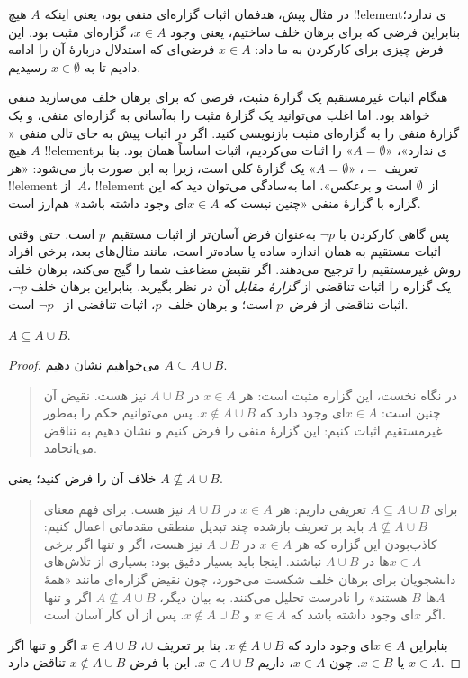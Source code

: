 \documentclass[../../../include/open-logic-section]{subfiles}
\begin{document}
در مثال پیش، هدفمان اثبات گزاره‌ای منفی بود، یعنی اینکه $A$ هیچ
!!{element}ی ندارد؛ بنابراین فرضی که برای برهان خلف ساختیم، یعنی وجود
$x \in A$، گزاره‌ای مثبت بود. این فرض چیزی برای کارکردن به ما داد:
$x \in A$ فرضی‌ای که استدلال دربارهٔ آن را ادامه دادیم تا به
$x \in \emptyset$ رسیدیم.

هنگام اثبات غیرمستقیم یک گزارهٔ مثبت، فرضی که برای برهان خلف می‌سازید
منفی خواهد بود. اما اغلب می‌توانید یک گزارهٔ مثبت را به‌آسانی به
گزاره‌ای منفی، و یک گزارهٔ منفی را به گزاره‌ای مثبت بازنویسی کنید.
اگر در اثبات پیش به جای تالی منفی «$A$ هیچ !!{element}ی ندارد»،
«$A = \emptyset$» را اثبات می‌کردیم، اثبات اساساً همان بود. بنا بر
تعریف $=$، «$A = \emptyset$» یک گزارهٔ کلی است، زیرا به این صورت باز
می‌شود: «هر !!{element} از~$A$، !!{element} از~$\emptyset$ است و
برعکس». اما به‌سادگی می‌توان دید که این گزاره با گزارهٔ منفی «چنین
نیست که $x \in A$ای وجود داشته باشد» هم‌ارز است.

پس گاهی کارکردن با $\lnot p$ به‌عنوان فرض آسان‌تر از اثبات مستقیم~$p$
است. حتی وقتی اثبات مستقیم به همان اندازه ساده یا ساده‌تر است، مانند
مثال‌های بعد، برخی افراد روش غیرمستقیم را ترجیح می‌دهند. اگر نقیض مضاعف
شما را گیج می‌کند، برهان خلف یک گزاره را اثبات تناقضی از
\emph{گزارهٔ مقابل} آن در نظر بگیرید. بنابراین برهان خلف $\lnot p$،
اثبات تناقضی از فرض~$p$ است؛ و برهان خلف~$p$، اثبات تناقضی از
~$\lnot p$ است.

\begin{prop}
$A \subseteq A \cup B$.
\end{prop}

\begin{proof}
  می‌خواهیم نشان دهیم $A \subseteq A \cup B$.
  \begin{quote}
    در نگاه نخست، این گزاره مثبت است: هر $x \in A$ در $A \cup B$ نیز
    هست. نقیض آن چنین است: $x \in A$ای وجود دارد که
    $x \notin A \cup B$. پس می‌توانیم حکم را به‌طور غیرمستقیم اثبات
    کنیم: این گزارهٔ منفی را فرض کنیم و نشان دهیم به تناقض می‌انجامد.
  \end{quote}
  خلاف آن را فرض کنید؛ یعنی $A \nsubseteq A \cup B$.
  \begin{quote}
    برای $A \subseteq A \cup B$ تعریفی داریم: هر $x \in A$ در
    $A \cup B$ نیز هست. برای فهم معنای $A \nsubseteq A \cup B$ باید
    بر تعریف بازشده چند تبدیل منطقی مقدماتی اعمال کنیم: کاذب‌بودن این
    گزاره که هر $x \in A$ در $A \cup B$ نیز هست، اگر و تنها اگر
    \emph{برخی} $x \in A$ها در $A \cup B$ نباشند. اینجا باید بسیار
    دقیق بود: بسیاری از تلاش‌های دانشجویان برای برهان خلف شکست می‌خورد،
    چون نقیض گزاره‌ای مانند «همهٔ $A$ها $B$ هستند» را نادرست تحلیل
    می‌کنند. به بیان دیگر، $A \nsubseteq A \cup B$ اگر و تنها اگر $x$ای
    وجود داشته باشد که $x \in A$ و $x \notin A \cup B$. پس از آن کار
    آسان است.
  \end{quote}
  بنابراین $x \in A$ای وجود دارد که $x \notin A \cup B$. بنا بر تعریف
  $\cup$، $x \in A \cup B$ اگر و تنها اگر $x \in A$ یا $x \in B$.
  چون $x \in A$، داریم $x \in A \cup B$. این با فرض
  $x \notin A \cup B$ تناقض دارد.
\end{proof}
\end{document}
